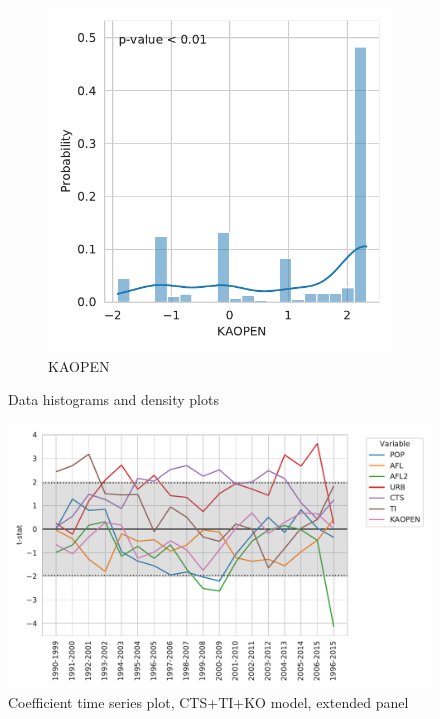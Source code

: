 \documentclass[12pt,a4paper]{article}
\begin{document}
\begin{figure}[htbp]\ContinuedFloat
\centering
\begin{subfigure}{0.45\textwidth}
\includegraphics[width=\textwidth]{./plots/dis/distplot_KAOPEN.pdf}
\caption{KAOPEN}
\end{subfigure}
\caption[]{Data histograms and density plots}
\end{figure}

\begin{figure}[htbp]
\centering
\includegraphics[width=\textwidth]{./plots/dis/parameter_time_stability_CTS+TI+KO.pdf}
\caption{Coefficient time series plot, CTS+TI+KO model, extended panel}
\label{fig:gmm_coefficient_time_series}
\end{figure}
\end{document}

